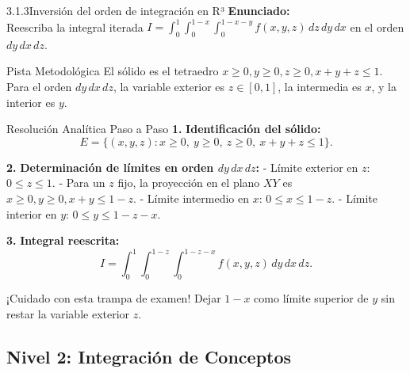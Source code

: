 \documentclass[11pt,a4paper]{article}
\begin{document}
\begin{nivelbox}{3.1.3}{Inversión del orden de integración en R³}
\textbf{Enunciado:}\\
Reescriba la integral iterada $I = \int_0^1 \int_0^{1-x} \int_0^{1-x-y} f(x,y,z) \, dz \, dy \, dx$ en el orden $dy \, dx \, dz$.

\begin{observacionbox}{Pista Metodológica}
El sólido es el tetraedro $x \ge 0, y \ge 0, z \ge 0, x+y+z \le 1$. Para el orden $dy \, dx \, dz$, la variable exterior es $z \in [0, 1]$, la intermedia es $x$, y la interior es $y$.
\end{observacionbox}

\begin{ejerciciobox}{Resolución Analítica Paso a Paso}
\smallskip\noindent\textbf{1.} \textbf{Identificación del sólido:}
\[E = \{ (x,y,z) : x \ge 0, \ y \ge 0, \ z \ge 0, \ x + y + z \le 1 \}.\]

\smallskip\noindent\textbf{2.} \textbf{Determinación de límites en orden $dy \, dx \, dz$:}
- Límite exterior en $z$: $0 \le z \le 1$.
- Para un $z$ fijo, la proyección en el plano $XY$ es $x \ge 0, y \ge 0, x + y \le 1 - z$.
- Límite intermedio en $x$: $0 \le x \le 1 - z$.
- Límite interior en $y$: $0 \le y \le 1 - z - x$.

\smallskip\noindent\textbf{3.} \textbf{Integral reescrita:}
\[I = \int_0^1 \int_0^{1-z} \int_0^{1-z-x} f(x,y,z) \, dy \, dx \, dz.\]
\end{ejerciciobox}

\begin{errorbox}{¡Cuidado con esta trampa de examen!}
Dejar $1-x$ como límite superior de $y$ sin restar la variable exterior $z$.
\end{errorbox}
\end{nivelbox}
\bigskip

\subsection{Nivel 2: Integración de Conceptos}
\end{document}
